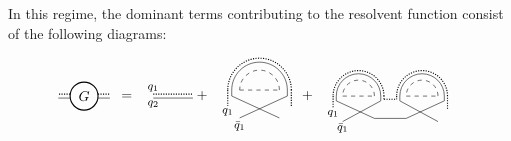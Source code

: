 \documentclass[aps,pra,reprint,superscriptaddress,twocolumn,notitlepage]{revtex4-1}
\numberwithin{equation}{section}
\begin{document}
In this regime, the dominant terms contributing to the resolvent function consist of the following diagrams:
\begin{widetext}
\begin{equation}
\begin{aligned}
\tikz[baseline=-0.5ex]{
    \draw[densely dotted,thick] (0.35,0.05)--(0.65,0.05);
    \draw[densely dotted,thick] (-0.35,0.05)--(-0.65,0.05);
    \draw (0.35,-0.05)--(0.65,-0.05);
    \draw (-0.35,-0.05)--(-0.65,-0.05);
    \draw[thick] (0,0) circle (10pt) node[anchor=center] {$G$};
    }
\ \, &= \ \,   \tikz[baseline=-0.5ex]{
    \draw[densely dotted,thick] (-0.5,0.05)--(0.5,0.05);
    \draw (-0.5,-0.05)--(0.5,-0.05);
    \draw (-0.5,0.2) circle (0.) node[anchor=center] {\footnotesize$q_1$};
    \draw (-0.5,-0.2) circle (0.) node[anchor=center] {\footnotesize$q_2$};
    }
 + \ \,
\tikz[baseline=-1.5ex]{
    \draw[dashed] (0,0) -- (1,0);
    \draw (-0.2,0.0)-- (-0.2,-0.15);
    \draw (-0.2,-0.15)-- (1.,-0.7);
    \draw (1.2,-0.15)-- (1.2,0.0);
    \draw (1.2,-0.15)-- (0,-0.7);
    \draw[densely dotted,thick] (-0.3,0.0)-- (-0.3,-0.4);
    \draw[densely dotted,thick] (1.3,-0.4)-- (1.3,0.0);
    \draw[dashed] (1,0) arc (0:180:0.5);
    \draw (1.2,0) arc (0:180:0.7);
    \draw[densely dotted,thick] (1.3,0) arc (0:180:0.8);
    \draw (-0.,-0.9) circle (0.) node[anchor=center] {\footnotesize$\bar{q}_1$};
    \draw (-0.3,-0.55) circle (0.) node[anchor=center] {\footnotesize$q_1$};
    }
\ \,
+
\ \,
\tikz[scale=0.8,baseline=-0.5ex]{
    \draw[dashed] (0,0) -- (1,0);
    \draw (-0.2,0.)-- (-0.2,-0.15);
    \draw (-0.2,-0.15)-- (1.,-0.7);
    \draw (1.2,-0.15)-- (1.2,0.0);
    \draw (1.2,-0.15)-- (0,-0.8);
    \draw[densely dotted,thick] (-0.3,0.)-- (-0.3,-0.4);
    \draw[densely dotted,thick] (1.3,-0.1)-- (1.3,0.);
    \draw[dashed] (2,0) -- (3,0);
    \draw (1.8,0.)-- (1.8,-0.15);
    \draw (1.8,-0.15)-- (3.,-0.8);
    \draw (3.2,-0.15)-- (3.2,0.);
    \draw (3.2,-0.15)-- (2,-0.7);
    \draw[densely dotted,thick] (1.7,0.)-- (1.7,-0.1);
    \draw[densely dotted,thick] (3.3,-0.4)-- (3.3,0.);
    \draw[densely dotted,thick] (1.3,-0.1)--(1.7,-0.1);
    \draw (1.0,-0.7)-- (2,-0.7);
    \draw[dashed] (1,0) arc (0:180:0.5);
    \draw (1.2,0) arc (0:180:0.7);
    \draw[densely dotted,thick] (1.3,0) arc (0:180:0.8);
    \draw[dashed] (3,0) arc (0:180:0.5);
    \draw (3.2,0) arc (0:180:0.7);
    \draw[densely dotted,thick] (3.3,0) arc (0:180:0.8);
    \draw (-0.,-1) circle (0.) node[anchor=center] {\footnotesize$\bar{q}_1$};
    \draw (-0.3,-0.55) circle (0.) node[anchor=center] {\footnotesize$q_1$};
}
\end{aligned}
\end{equation}
\end{widetext}
\end{document}
